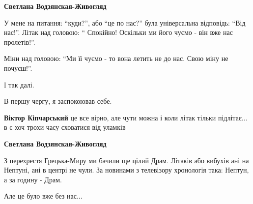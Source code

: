 \begin{itemize} %
\textbf{Светлана Водзянская-Живогляд} 

У мене на питання: \enquote{куди?}, або \enquote{це по нас?} була універсальна відповідь: \enquote{Від
нас!}. Літак над головою: \enquote{ Спокійно! Оскільки ми його чуємо - він вже нас
пролетів!}.

Міни над головою: \enquote{Ми її чуємо - то вона летить не до нас. Свою міну не почуєш!}.

І так далі.

В першу чергу, я заспокоював себе.

\textbf{Віктор Кіпчарський} це все вірно, але чути можна і коли літак тільки підлітає... в є хоч трохи часу сховатися від уламків

\textbf{Светлана Водзянская-Живогляд} 

З перехрестя Грецька-Миру ми бачили ще цілий Драм. Літаків або вибухів ані на
Нептуні, ані в центрі не чули. За новинами з телевізору хронологія така:
Нептун, а за годину - Драм.

Але це було вже без нас...

\end{itemize} %
